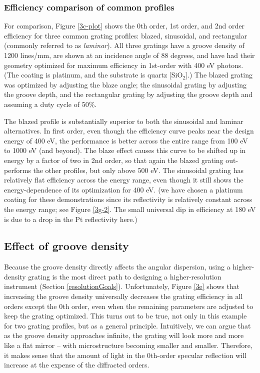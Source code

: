 \subsubsection{Efficiency comparison of common profiles}
For comparison, Figure \ref{3c-plot} shows the 0th order, 1st order, and 2nd order efficiency for three common grating profiles: blazed, sinusoidal, and rectangular (commonly referred to as \emph{laminar}).  All three gratings have a groove density of 1200 lines/mm, are shown at an incidence angle of 88 degrees, and have had their geometry optimized for maximum efficiency in 1st-order with 400 eV photons.  (The coating is platinum, and the substrate is quartz [SiO$_2$].)  The blazed grating was optimized by adjusting the blaze angle; the sinusoidal grating by adjusting the groove depth, and the rectangular grating by adjusting the groove depth and assuming a duty cycle of 50\%.

The blazed profile is substantially superior to both the sinusoidal and laminar alternatives.  In first order, even though the efficiency curve peaks near the design energy of 400 eV, the performance is better across the entire range from 100 eV to 1000 eV (and beyond).  The blaze effect causes this curve to be shifted up in energy by a factor of two in 2nd order, so that again the blazed grating out-performs the other profiles, but only above 500 eV.  The sinusoidal grating has relatively flat efficiency across the energy range, even though it still shows the energy-dependence of its optimization for 400 eV.   (we have chosen a platinum coating for these demonstrations since its reflectivity is relatively constant across the energy range; see Figure \ref{3g-2}.  The small universal dip in efficiency at 180 eV is due to a drop in the Pt reflectivity here.)

\subsection{Effect of groove density}
Because the groove density directly affects the angular dispersion, using a higher-density grating is the most direct path to designing a higher-resolution instrument (Section \ref{resolutionGoals}).  Unfortunately, Figure \ref{3e} shows that increasing the groove density universally decreases the grating efficiency in all orders except the 0th order, even when the remaining parameters are adjusted to keep the grating optimized.  This turns out to be true, not only in this example for two grating profiles, but as a general principle.  Intuitively, we can argue that as the groove density approaches infinite, the grating will look more and more like a flat mirror -- with microstructure becoming smaller and smaller.  Therefore, it makes sense that the amount of light in the 0th-order specular reflection will increase at the expense of the diffracted orders.

